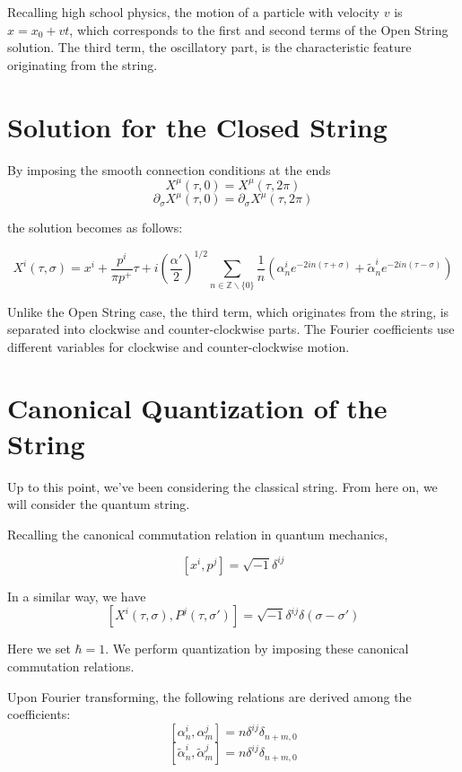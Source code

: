 \documentclass[uplatex]{jsarticle}
\begin{document}
Recalling high school physics, the motion of a particle with velocity
$v$
is
$x = x_{0} + vt$,
which corresponds to the first and second terms of the Open String solution.
The third term, the oscillatory part, is the characteristic feature originating from the string.

\section{Solution for the Closed String}

By imposing the smooth connection conditions at the ends
$$
	X^{\mu}(\tau, 0)
	=
	X^{\mu}(\tau, 2 \pi)
$$
$$
	\partial_{\sigma} X^{\mu}(\tau, 0)
	=
	\partial_{\sigma} X^{\mu}(\tau, 2 \pi)
$$

the solution becomes as follows:

$$
	X^{i}(\tau, \sigma)
	=
	x^{i} + \frac{p^{i}}{\pi p^{+}} \tau
	+
	i \left( \frac{\alpha'}{2} \right)^{1/2} \sum_{n \in \mathbb{Z} \backslash \{ 0 \} }
	\frac{1}{n}
	\left(
	\alpha^{i}_{n} e^{- 2 i n (\tau + \sigma) }
	+
	\tilde{\alpha}^{i}_{n} e^{- 2 i n (\tau - \sigma) }
	\right)
$$

Unlike the Open String case, the third term, which originates from the string, is separated into clockwise and counter-clockwise parts.
The Fourier coefficients use different variables for clockwise and counter-clockwise motion.

\section{Canonical Quantization of the String}

Up to this point, we've been considering the classical string.
From here on, we will consider the quantum string.

Recalling the canonical commutation relation in quantum mechanics,

$$
	[x^{i} , p^{j}] = \sqrt{-1} \delta^{ij}
$$

In a similar way, we have
$$
	[X^{i}(\tau, \sigma) , P^{j}(\tau, \sigma')] = \sqrt{-1} \delta^{ij} \delta(\sigma - \sigma')
$$

Here we set
$\hbar=1$.
We perform quantization by imposing these canonical commutation relations.

Upon Fourier transforming, the following relations are derived among the coefficients:
$$
	[\alpha^{i}_{n} , \alpha^{j}_{m}] = n \delta^{ij} \delta_{n+m, 0}
$$
$$
	[ \tilde{\alpha}^{i}_{n} , \tilde{\alpha}^{j}_{m}] = n \delta^{ij} \delta_{n+m, 0}
$$
\end{document}
